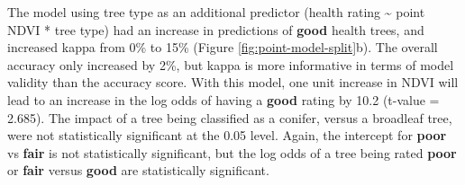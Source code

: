 \documentclass[12pt,twoside]{reedthesis}
\begin{document}
The model using tree type as an additional predictor (health rating \textasciitilde{}
point NDVI * tree type) had an increase in predictions of \textbf{good}
health trees, and increased kappa from 0\% to 15\% (Figure
\ref{fig:point-model-split}b). The overall accuracy only increased by
2\%, but kappa is more informative in terms of model validity than the
accuracy score. With this model, one unit increase in NDVI will lead to
an increase in the log odds of having a \textbf{good} rating by 10.2 (t-value
= 2.685). The impact of a tree being classified as a conifer, versus a
broadleaf tree, were not statistically significant at the 0.05 level.
Again, the intercept for \textbf{poor} vs \textbf{fair} is not statistically
significant, but the log odds of a tree being rated \textbf{poor} or \textbf{fair}
versus \textbf{good} are statistically significant.
\end{document}
